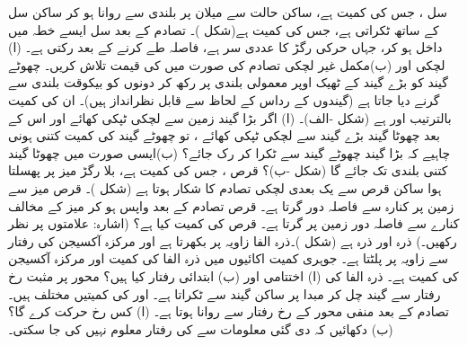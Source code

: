 سل ، جس کی کمیت  ہے، ساکن حالت سے میلان پر  بلندی سے روانا ہو کر ساکن  سل   کے ساتھ ٹکراتی ہے، جس کی کمیت  ہے(شکل )۔ تصادم کے بعد سل  ایسے خطہ میں داخل ہو کر، جہاں حرکی رگڑ کا عددی سر  ہے،  فاصلہ  طے کرنے کے بعد رکتی ہے۔ (ا) لچکی اور (ب)مکمل  غیر لچکی  تصادم کی صورت میں  کی قیمت تلاش کریں۔
چھوٹے گیند کو بڑے گیند کے ٹھیک اوپر  معمولی  بلندی پر  رکھ کر دونوں کو بیکوقت  بلندی سے  گرنے دیا جاتا ہے (گیندوں کے رداس   کے لحاظ سے قابل نظرانداز ہیں)۔ ان کی کمیت بالترتیب  اور  ہے (شکل -الف)۔ (ا) اگر   بڑا گیند زمین سے لچکی ٹپکی کھائے اور  اس کے بعد چھوٹا گیند  بڑے گیند سے لچکی ٹپکی کھائے ، تو چھوٹے گیند کی کمیت  کتنی  ہونی چاہیے کہ بڑا گیند  چھوٹے گیند سے ٹکرا کر رک جائے؟ (ب)ایسی صورت میں   چھوٹا گیند  کتنی بلندی تک جائے گا  (شکل -ب)؟
قرص ، جس کی کمیت  ہے،  بلا رگڑ میز پر پھسلتا ہوا  ساکن قرص  سے یک بعدی لچکی تصادم کا شکار ہوتا  ہے (شکل )۔ قرص  میز سے زمین پر کنارہ سے  فاصلہ دور گرتا ہے۔ قرص    تصادم کے بعد واپس  ہو کر  میز کے مخالف کنارے سے  فاصلہ دور زمین پر گرتا ہے۔ قرص  کی کمیت کیا ہے؟ (اشارہ: علامتوں پر نظر رکھیں۔)
ذرہ   اور ذرہ   ہے (شکل )۔ذرہ  الفا زاویہ    پر بکھرتا  ہے اور مرکزہ آکسیجن   کی رفتار  سے زاویہ   پر پلٹتا ہے۔ جوہری کمیت اکائیوں میں ذرہ الفا  کی کمیت
  اور  مرکزہ آکسیجن کی کمیت  ہے۔ ذرہ الفا کی (ا) اختتامی اور (ب) ابتدائی رفتار کیا ہیں؟
محور   پر مثبت  رخ    رفتار سے گیند   چل کر مبدا پر ساکن گیند  سے ٹکراتا ہے۔ اور   کی کمیتیں مختلف ہیں۔ تصادم کے  بعد  منفی  محور  کے رخ  رفتار سے روانا ہوتا ہے۔ (ا)  کس رخ  حرکت کرے گا؟ (ب)  دکھائیں کہ دی گئی معلومات سے  کی رفتار معلوم نہیں کی جا سکتی۔
